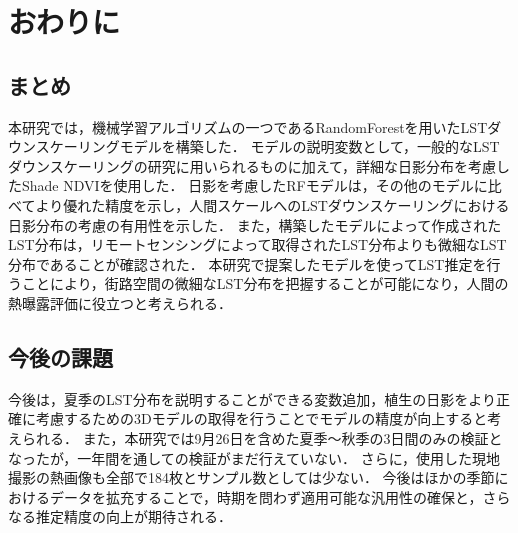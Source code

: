 \documentclass[12pt,epsf]{jreport}
\begin{document}
\chapter{おわりに}
 \section{まとめ}
 本研究では，機械学習アルゴリズムの一つであるRandomForestを用いたLSTダウンスケーリングモデルを構築した．
 モデルの説明変数として，一般的なLSTダウンスケーリングの研究に用いられるものに加えて，詳細な日影分布を考慮したShade NDVIを使用した．
 日影を考慮したRFモデルは，その他のモデルに比べてより優れた精度を示し，人間スケールへのLSTダウンスケーリングにおける日影分布の考慮の有用性を示した．
 また，構築したモデルによって作成されたLST分布は，リモートセンシングによって取得されたLST分布よりも微細なLST分布であることが確認された．
 本研究で提案したモデルを使ってLST推定を行うことにより，街路空間の微細なLST分布を把握することが可能になり，人間の熱曝露評価に役立つと考えられる．

 \section{今後の課題}
 今後は，夏季のLST分布を説明することができる変数追加，植生の日影をより正確に考慮するための3Dモデルの取得を行うことでモデルの精度が向上すると考えられる．
 また，本研究では9月26日を含めた夏季～秋季の3日間のみの検証となったが，一年間を通しての検証がまだ行えていない．
 さらに，使用した現地撮影の熱画像も全部で184枚とサンプル数としては少ない．
 今後はほかの季節におけるデータを拡充することで，時期を問わず適用可能な汎用性の確保と，さらなる推定精度の向上が期待される．


\newpage

%




\printindex

\end{document}
